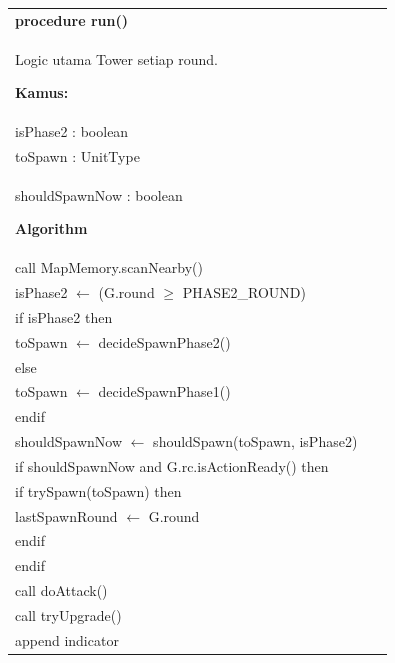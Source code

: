 \documentclass{article}
\newenvironment{pseudobox}
{
\centering
\begin{longtable}{|p{0.94\linewidth}|}
\hline
}
{
\\ \hline
\end{longtable}
\vspace{0.05cm}
}
\begin{document}
\begin{pseudobox}
\textbf{procedure run()} \\
{ Logic utama Tower setiap round. }

\textbf{Kamus:} \\
\hspace*{1em} isPhase2 : boolean \\
\hspace*{1em} toSpawn : UnitType \\
\hspace*{1em} shouldSpawnNow : boolean

\textbf{Algorithm} \\
\hspace*{1em} call MapMemory.scanNearby() \\

\hspace*{1em} isPhase2 $\leftarrow$ (G.round $\geq$ PHASE2\_ROUND) \\

\hspace*{1em} if isPhase2 then \\
\hspace*{2em} toSpawn $\leftarrow$ decideSpawnPhase2() \\
\hspace*{1em} else \\
\hspace*{2em} toSpawn $\leftarrow$ decideSpawnPhase1() \\
\hspace*{1em} endif \\

\hspace*{1em} shouldSpawnNow $\leftarrow$ shouldSpawn(toSpawn, isPhase2) \\

\hspace*{1em} if shouldSpawnNow and G.rc.isActionReady() then \\
\hspace*{2em} if trySpawn(toSpawn) then \\
\hspace*{3em} lastSpawnRound $\leftarrow$ G.round \\
\hspace*{2em} endif \\
\hspace*{1em} endif \\

\hspace*{1em} call doAttack() \\
\hspace*{1em} call tryUpgrade() \\

\hspace*{1em} append indicator
\end{pseudobox}
\end{document}
